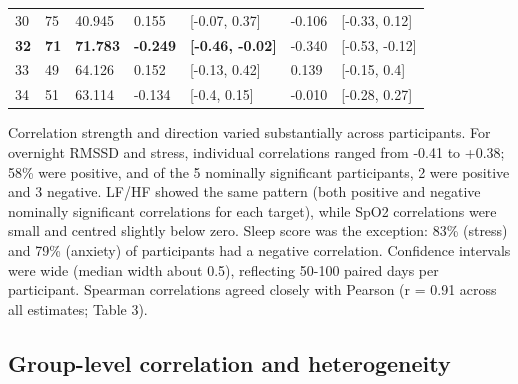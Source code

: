 \documentclass[11pt, a4paper, oneside]{article}
\begin{document}
\begin{table}[H]
\begin{tabularx}{\textwidth}{XXXXXXX}
        30  & 75   & 40.945  & 0.155 & [-0.07, 0.37] & -0.106 & [-0.33, 0.12]\\
        \textbf{32}  & \textbf{71}   & \textbf{71.783}  &\textbf{-0.249}& \textbf{[-0.46, -0.02]} & -0.340 &[-0.53, -0.12]\\
        33  & 49   & 64.126    & 0.152 & [-0.13, 0.42] & 0.139 & [-0.15, 0.4]\\
        34  & 51   & 63.114  & -0.134& [-0.4, 0.15] & -0.010 & [-0.28, 0.27]\\
        \bottomrule
    \end{tabularx}
    \label{tab:Table_3}
\end{table}

Correlation strength and direction varied substantially across participants. For overnight RMSSD and stress, individual correlations ranged from -0.41 to +0.38; 58\% were positive, and of the 5 nominally significant participants, 2 were positive and 3 negative. LF/HF showed the same pattern (both positive and negative nominally significant correlations for each target), while SpO2 correlations were small and centred slightly below zero. Sleep score was the exception: 83\% (stress) and 79\% (anxiety) of participants had a negative correlation. Confidence intervals were wide (median width about 0.5), reflecting 50-100 paired days per participant. Spearman correlations agreed closely with Pearson (r = 0.91 across all estimates; Table 3).

\subsection{Group-level correlation and heterogeneity}
\end{document}
